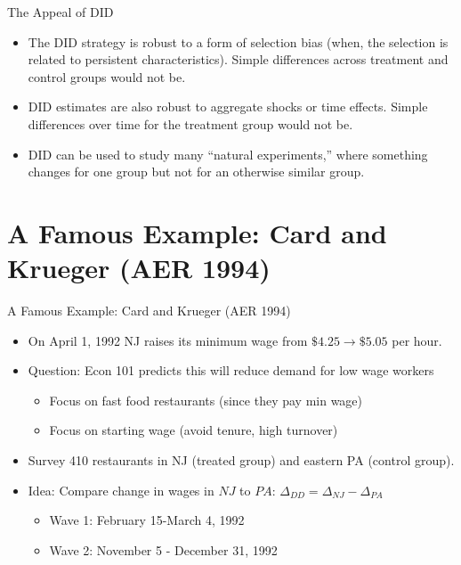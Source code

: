 \documentclass[aspectratio=169,11pt]{beamer}
\begin{document}
\begin{frame}{The Appeal of DID}
\begin{itemize}
  \item The DID strategy is robust to a form of selection bias
  (when, the selection is related to persistent characteristics).
  Simple differences across treatment and control groups would not be.

  \medskip
  \item DID estimates are also robust to aggregate shocks or time effects. Simple differences
  over time for the treatment group would not be.

  \medskip
  \item DID can be used to study many ``natural experiments,'' where something
  changes for one group but not for an otherwise similar group.

\end{itemize}
\end{frame}

\section{A Famous Example: Card and Krueger (AER 1994)}

\begin{frame}{A Famous Example: Card and Krueger (AER 1994)}
\begin{itemize}
\item On April 1, 1992 NJ raises its minimum wage from $\$4.25\rightarrow \$5.05$ per hour.
\item Question: Econ 101 predicts this will \alert{reduce demand for low wage workers}
\begin{itemize}
\item Focus on fast food restaurants (since they pay min wage)
\item Focus on starting wage (avoid tenure, high turnover)
\end{itemize}
\item Survey 410 restaurants in NJ (treated group) and eastern PA (control group).
\item Idea: Compare \alert{change} in wages in $NJ$ to $PA$:  $\Delta_{DD} = \Delta_{NJ}- \Delta_{PA}$
\begin{itemize}
\item Wave 1: February 15-March 4, 1992
\item Wave 2: November 5 - December 31, 1992
\end{itemize}
\end{itemize}
\end{frame}
\end{document}
